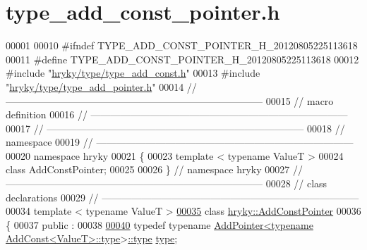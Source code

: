 \hypertarget{type__add__const__pointer_8h_source}{\section{type\-\_\-add\-\_\-const\-\_\-pointer.\-h}
}

\begin{DoxyCode}
00001 
00010 \textcolor{preprocessor}{#ifndef TYPE\_ADD\_CONST\_POINTER\_H\_20120805225113618}
00011 \textcolor{preprocessor}{}\textcolor{preprocessor}{#define TYPE\_ADD\_CONST\_POINTER\_H\_20120805225113618}
00012 \textcolor{preprocessor}{}\textcolor{preprocessor}{#include "\hyperlink{type__add__const_8h}{hryky/type/type_add_const.h}"}
00013 \textcolor{preprocessor}{#include "\hyperlink{type__add__pointer_8h}{hryky/type/type_add_pointer.h}"}
00014 \textcolor{comment}{//
      ------------------------------------------------------------------------------}
00015 \textcolor{comment}{// macro definition}
00016 \textcolor{comment}{//
      ------------------------------------------------------------------------------}
00017 \textcolor{comment}{//
      ------------------------------------------------------------------------------}
00018 \textcolor{comment}{// namespace}
00019 \textcolor{comment}{//
      ------------------------------------------------------------------------------}
00020 \textcolor{keyword}{namespace }hryky
00021 \{
00023     \textcolor{keyword}{template} < \textcolor{keyword}{typename} ValueT >
00024     \textcolor{keyword}{class }AddConstPointer;
00025 
00026 \} \textcolor{comment}{// namespace hryky}
00027 \textcolor{comment}{//
      ------------------------------------------------------------------------------}
00028 \textcolor{comment}{// class declarations}
00029 \textcolor{comment}{//
      ------------------------------------------------------------------------------}
00034 \textcolor{comment}{}\textcolor{keyword}{template} < \textcolor{keyword}{typename} ValueT >
\hypertarget{type__add__const__pointer_8h_source_l00035}{}\hyperlink{classhryky_1_1_add_const_pointer}{00035} \textcolor{keyword}{class }\hyperlink{classhryky_1_1_add_const_pointer}{hryky::AddConstPointer}
00036 \{
00037 \textcolor{keyword}{public} :
00038 
\hypertarget{type__add__const__pointer_8h_source_l00040}{}\hyperlink{classhryky_1_1_add_const_pointer_a62e5c44fefac145f6bd2460e4c8d0ba2}{00040}     \textcolor{keyword}{typedef} \textcolor{keyword}{typename} \hyperlink{classhryky_1_1_add_pointer}{AddPointer<typename AddConst<ValueT>::type}>\hyperlink{classhryky_1_1_add_const_pointer_a62e5c44fefac145f6bd2460e4c8d0ba2}{::type} \hyperlink{classhryky_1_1_add_const_pointer_a62e5c44fefac145f6bd2460e4c8d0ba2}{type};

\end{DoxyCode}
